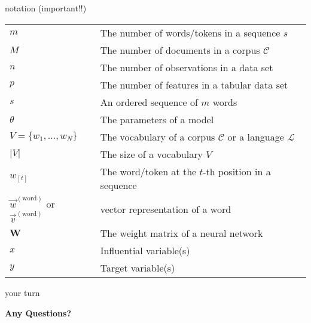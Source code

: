 \begin{vbframe}{notation (important!!)}

\vfill

\begin{tabular}{ll}
        $m$ & The number of words/tokens in a sequence $s$\\[.5em]
        $M$ & The number of documents in a corpus $\mathcal{C}$\\[.5em]
        $n$ & The number of observations in a data set\\[.5em]
        $p$ & The number of features in a tabular data set\\[.5em]
        $s$ & An ordered sequence of $m$ words\\[.5em]
        $\theta$ & The parameters of a model\\[.5em]
        $V = \{ w_1, \hdots, w_N \}$ & The vocabulary of a corpus $\mathcal{C}$ or a language $\mathcal{L}$\\[.5em]
        $|V|$ & The size of a vocabulary $V$\\[.5em]
        $w_{\left[t\right]}$ & The word/token at the $t$-th position in a sequence\\[.5em]
				$\vec w^{({\text{word}})}$ or $\vec v^{({\text{word}})}$ & vector representation of a word\\[.5em]
        $\mathbf{W}$ & The weight matrix of a neural network\\[.5em]
        $x$ & Influential variable(s)\\[.5em]
        $y$ & Target variable(s)\\[.5em]
\end{tabular}

\vfill

\end{vbframe}


\begin{vbframe}{your turn}

\vfill

\centering \Huge{\bf Any Questions?}

\vfill

\end{vbframe}


\endlecture
